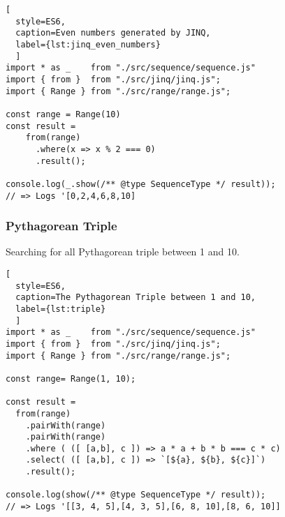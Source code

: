\begin{lstlisting}[
  style=ES6, 
  caption=Even numbers generated by JINQ,
  label={lst:jinq_even_numbers}
  ]
import * as _    from "./src/sequence/sequence.js"
import { from }  from "./src/jinq/jinq.js";
import { Range } from "./src/range/range.js";

const range = Range(10)
const result =
    from(range)
      .where(x => x % 2 === 0)
      .result();

console.log(_.show(/** @type SequenceType */ result));
// => Logs '[0,2,4,6,8,10]
\end{lstlisting}


\subsubsection{Pythagorean Triple}
Searching for all Pythagorean triple between 1 and 10.

\begin{lstlisting}[
  style=ES6, 
  caption=The Pythagorean Triple between 1 and 10,
  label={lst:triple}
  ]
import * as _    from "./src/sequence/sequence.js"
import { from }  from "./src/jinq/jinq.js";
import { Range } from "./src/range/range.js";

const range= Range(1, 10);

const result =
  from(range)
    .pairWith(range)
    .pairWith(range)
    .where ( ([ [a,b], c ]) => a * a + b * b === c * c)
    .select( ([ [a,b], c ]) => `[${a}, ${b}, ${c}]`)
    .result();

console.log(show(/** @type SequenceType */ result));
// => Logs '[[3, 4, 5],[4, 3, 5],[6, 8, 10],[8, 6, 10]]
\end{lstlisting}
